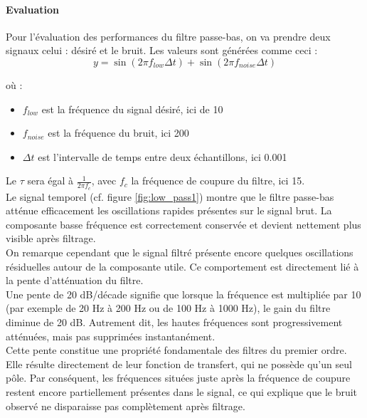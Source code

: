 \paragraph{Evaluation}

Pour l'évaluation des performances du filtre passe-bas, on va prendre deux signaux celui : désiré et le bruit. Les valeurs sont générées comme ceci :
\begin{equation}
    y = \sin(2 \pi f_{low} \Delta t) + \sin(2 \pi f_{noise} \Delta t)
\end{equation}

où :
\begin{itemize}
    \item $f_{low}$ est la fréquence du signal désiré, ici de 10
    \item $f_{noise}$ est la fréquence du bruit, ici 200
    \item $\Delta t$ est l'intervalle de temps entre deux échantillons, ici 0.001
\end{itemize}

Le $\tau$ sera égal à $\frac{1}{2 \pi f_c}$, avec $f_c$ la fréquence de coupure du filtre, ici 15. \\

Le signal temporel (cf. figure \ref{fig:low_pass1}) montre que le filtre passe-bas atténue efficacement 
les oscillations rapides présentes sur le signal brut. La composante basse fréquence est correctement 
conservée et devient nettement plus visible après filtrage. \\

On remarque cependant que le signal filtré présente encore quelques oscillations résiduelles autour de la composante utile. Ce comportement est directement lié à la pente d'atténuation du filtre. \\

Une pente de 20 dB/décade signifie que lorsque la fréquence est multipliée par 10 (par exemple de 20 Hz à 200 Hz ou de 100 Hz à 1000 Hz), le gain du filtre diminue de 20 dB. Autrement dit, les hautes fréquences sont progressivement atténuées, mais pas supprimées instantanément. \\

Cette pente constitue une propriété fondamentale des filtres du premier ordre. Elle résulte directement de leur fonction de transfert, qui ne possède qu'un seul pôle. Par conséquent, les fréquences situées juste après la fréquence de coupure restent encore partiellement présentes dans le signal, ce qui explique que le bruit observé ne disparaisse pas complètement après filtrage. \\

